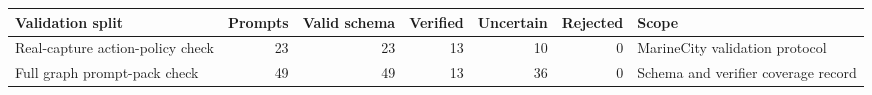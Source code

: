 \begin{tabularx}{\linewidth}{lrrrrrY}
\toprule
Validation split & Prompts & Valid schema & Verified & Uncertain & Rejected & Scope \\
\midrule
Real-capture action-policy check & 23 & 23 & 13 & 10 & 0 & MarineCity validation protocol \\
Full graph prompt-pack check & 49 & 49 & 13 & 36 & 0 & Schema and verifier coverage record \\
\bottomrule
\end{tabularx}
